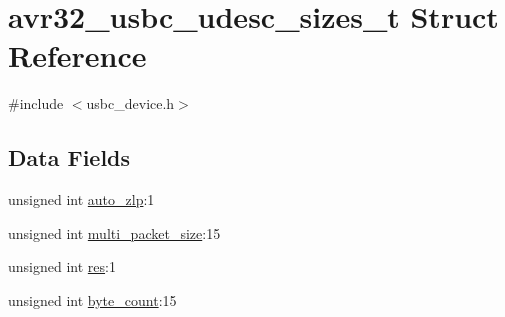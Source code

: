 \hypertarget{structavr32__usbc__udesc__sizes__t}{
\section{avr32\-\_\-usbc\-\_\-udesc\-\_\-sizes\-\_\-t \-Struct \-Reference}
\label{structavr32__usbc__udesc__sizes__t}
}


{\ttfamily \#include $<$usbc\-\_\-device.\-h$>$}

\subsection*{\-Data \-Fields}
\begin{DoxyCompactItemize}
\item 
unsigned int \hyperlink{structavr32__usbc__udesc__sizes__t_aa8c8fab669dcb353291171bc2a1ec2c1}{auto\-\_\-zlp}\-:1
\item 
unsigned int \hyperlink{structavr32__usbc__udesc__sizes__t_ae026c9f636627d65b351846c0068a916}{multi\-\_\-packet\-\_\-size}\-:15
\item 
unsigned int \hyperlink{structavr32__usbc__udesc__sizes__t_aee49c3bdbca6c637246f1ae3f605ea9e}{res}\-:1
\item 
unsigned int \hyperlink{structavr32__usbc__udesc__sizes__t_aa8eaa8ddccbedd07f1ea52402e9926cc}{byte\-\_\-count}\-:15
\end{DoxyCompactItemize}


